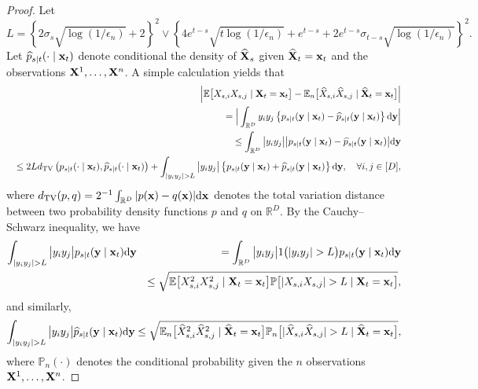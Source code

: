 \documentclass[11pt,a4paper,final]{article}
\numberwithin{equation}{section}
\theoremstyle{remark}
\newcommand{\bx}{{\bf x}}
\newcommand{\bX}{{\bf X}}
\newcommand{\by}{{\bf y}}
\newcommand{\bbE}{{\mathbb E}}
\newcommand{\bbR}{{\mathbb R}}
\newcommand{\bbP}{{\mathbb P}}
\newcommand{\be}{\begin{equation}}
\newcommand{\ee}{\end{equation}}
\newcommand{\bean}{\setlength\arraycolsep{1pt}\begin{eqnarray*}}
\newcommand{\eean}{\end{eqnarray*}}
\def\d{{\rm d}}
\begin{document}
\begin{proof}
Let
\be
L =  \left\{ 2 \sigma_{s} \sqrt{ \log (1/\epsilon_n) } + 2\right\}^{2}
 \vee \left\{ 4 e^{t-s} \sqrt{t \log (1/\epsilon_n) } + e^{t-s} + 2 e^{t-s}\sigma_{t-s} \sqrt{\log (1 / \epsilon_n) } \right\}^2.
\label{eqthm2:L_def}
\ee
Let $\widehat p_{s \mid t} (\cdot \mid \bx_{t} )$ denote conditional the density of $\widehat \bX_{s}$ given $\widehat \bX_{t} = \bx_{t} $ and the observations $\bX^1, \ldots, \bX^n$.
A simple calculation yields that
\bean
&& \Big\vert \bbE \big[  X_{s,i}  X_{s ,j} \mid  \bX_{t} = \bx_{t} \big] - \bbE_n \big[ \widehat X_{s,i} \widehat X_{s ,j} \mid \widehat \bX_{t} = \bx_{t} \big]  \Big\vert 
\\
&& =   \Big\vert \int_{\bbR^{D}} y_i y_j  \left\{ p_{s \mid t}(\by \mid \bx_{t} ) -  \widehat p_{s \mid t}(\by \mid \bx_{t} )  \right\} \d \by  \Big\vert 
\\
&& \leq \int_{\bbR^{D}}  \big\vert y_i y_j \big\vert   \big\vert p_{s \mid t}(\by \mid \bx_{t} ) -  \widehat p_{s \mid t}(\by \mid \bx_{t} ) \big\vert \d \by 
\\
&& \leq 2 L d_{\rm TV} \left( p_{s \mid t}(\cdot \mid \bx_{t} ), \widehat p_{s \mid t}(\cdot \mid \bx_{t} ) \right)
+  \int_{ \vert y_i y_j \vert > L}  \big\vert y_i y_j \big\vert \left\{   p_{s \mid t}(\by \mid \bx_{t} ) +  \widehat p_{s \mid t}(\by \mid \bx_{t} ) \right\} \d \by,
\quad \forall i,j \in [D],
\eean
where $d_{\rm TV} (p,q) = 2^{-1} \int_{\bbR^{D}} \vert p(\bx) -q(\bx) \vert \d \bx $ denotes the total variation distance between two probability density functions $p$ and $q$ on $\bbR^{D}$.
By the Cauchy--Schwarz inequality, we have
\bean
\int_{ \vert y_i y_j \vert > L}  \big\vert y_i y_j \big\vert   p_{s \mid t}(\by \mid \bx_{t} )\d \by
&& = \int_{ \bbR^{D} }  \big\vert y_i y_j \big\vert 1 \big( \vert y_i y_j \vert > L \big)  p_{s \mid t}(\by \mid \bx_{t} )\d \by
\\
&& \leq \sqrt{ \bbE \big[ X_{s,i}^2 X_{s,j}^2 \mid \bX_{t} = \bx_{t} \big] 
\bbP \big[ \vert X_{s,i} X_{s,j} \vert > L \mid \bX_{t} = \bx_{t} \big]  },
\eean
and similarly, 
\bean
\int_{ \vert y_i y_j \vert > L}  \big\vert y_i y_j \big\vert  \widehat p_{s \mid t}(\by \mid \bx_{t} )\d \by
\leq \sqrt{ \bbE_{n} \big[ \widehat X_{s,i}^2 \widehat X_{s,j}^2 \mid \widehat \bX_{t} = \bx_{t} \big] 
\bbP_{n} \big[ \vert \widehat X_{s,i} \widehat X_{s,j} \vert > L \mid \widehat \bX_{t} = \bx_{t} \big]  },
\eean
where $\bbP_{n}(\cdot)$ denotes the conditional probability given the $n$ observations $\bX^1,\ldots,\bX^n$.



\end{proof}
\end{document}
